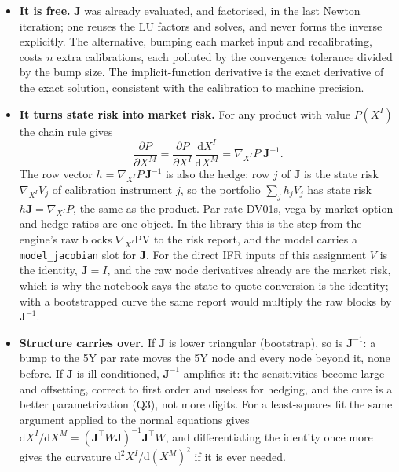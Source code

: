 \documentclass[11pt]{article}
\newcommand{\XI}{X^{I}}
\newcommand{\XM}{X^{M}}
\newcommand{\J}{\mathbf{J}}
\newcommand{\dd}{\mathrm{d}}
\begin{document}
\begin{itemize}[leftmargin=*]
\item \textbf{It is free.} $\J$ was already evaluated, and factorised, in the last Newton iteration; one reuses the LU factors and solves, and never forms the inverse explicitly. The alternative, bumping each market input and recalibrating, costs $n$ extra calibrations, each polluted by the convergence tolerance divided by the bump size. The implicit-function derivative is the exact derivative of the exact solution, consistent with the calibration to machine precision.
\item \textbf{It turns state risk into market risk.} For any product with value $P(\XI)$ the chain rule gives
\[
\frac{\partial P}{\partial\XM}=\frac{\partial P}{\partial\XI}\,\frac{\dd\XI}{\dd\XM}=\nabla_{\XI}P\;\J^{-1}.
\]
The row vector $h=\nabla_{\XI}P\,\J^{-1}$ is also the hedge: row $j$ of $\J$ is the state risk $\nabla_{\XI}V_j$ of calibration instrument $j$, so the portfolio $\sum_j h_jV_j$ has state risk $h\J=\nabla_{\XI}P$, the same as the product. Par-rate DV01s, vega by market option and hedge ratios are one object. In the library this is the step from the engine's raw blocks $\nabla_{\XI}\mathrm{PV}$ to the risk report, and the model carries a \texttt{model\_jacobian} slot for $\J$. For the direct IFR inputs of this assignment $V$ is the identity, $\J=I$, and the raw node derivatives already are the market risk, which is why the notebook says the state-to-quote conversion is the identity; with a bootstrapped curve the same report would multiply the raw blocks by $\J^{-1}$.
\item \textbf{Structure carries over.} If $\J$ is lower triangular (bootstrap), so is $\J^{-1}$: a bump to the 5Y par rate moves the 5Y node and every node beyond it, none before. If $\J$ is ill conditioned, $\J^{-1}$ amplifies it: the sensitivities become large and offsetting, correct to first order and useless for hedging, and the cure is a better parametrization (Q3), not more digits. For a least-squares fit the same argument applied to the normal equations gives $\dd\XI/\dd\XM=(\J^{\top}W\J)^{-1}\J^{\top}W$, and differentiating the identity once more gives the curvature $\dd^2\XI/\dd(\XM)^2$ if it is ever needed.
\end{itemize}
\end{document}
